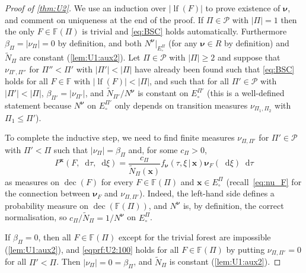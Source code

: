 \documentclass[reqno,draft]{amsart}
\numberwithin{equation}{section}
\theoremstyle{plain}
\theoremstyle{remark}
\newcommand*\diff{\mathop{}\!\mathrm{d}}
\newcommand{\fpart}{\Pi} %
\newcommand{\nurates}{R} %
\DeclareMathOperator{\lf}{lf}
\DeclareMathOperator{\dcb}{dec}
\newcommand{\fnu}{f_{\boldsymbol \nu}}
\newcommand{\nn}{\widetilde{N}} %
\newcommand{\la}{\beta} %
\newcommand{\nut}[1]{|\nu_{#1}|}
\begin{document}
\def\fmerge{\fpart_\text{m}}
\def\fnomerge{\fpart_\text{n}}
\begin{proof}[Proof of \cref{thm:U2}]
    We use an induction over $|\lf(F)|$ to prove existence of $\boldsymbol \nu$, and comment on uniqueness at the end of the proof. If $\fpart \in \mathcal{P}$ with $|\fpart| = 1$ then the only $F\in \mathbb{F}(\fpart)$ is trivial and \cref{eq:BSC} holds automatically. Furthermore $\la_\fpart = \nut{\fpart} = 0$ by definition, and both $N^{\boldsymbol \nu} \vert_{E^\fpart_\circ }$ (for any $\boldsymbol \nu\in \nurates$ by definition) and $\nn_\fpart$ are constant (\cref{lem:U1:aux2}). Let $\fpart \in \mathcal{P}$ with $|\fpart| \ge 2$ and suppose that $\nu_{\fpart',\fpart''}$ for $\fpart'' < \fpart'$ with $|\fpart'| < |\fpart|$ have already been found such that \cref{eq:BSC} holds for all $F\in \mathbb{F}$ with $|\lf(F)| < |\fpart|$, and such that for all $\fpart'\in \mathcal{P}$ with $|\fpart'| < |\fpart|$, $\la_{\fpart'} = \nut{\fpart'}$, and $\nn_{\fpart'} / N^{\boldsymbol \nu}$ is constant on $E^{\fpart'}_\circ $ (this is a well-defined statement because $N^{\boldsymbol \nu}$ on $E^{\fpart'}_\circ $ only depends on transition measures $\nu_{\fpart_1,\fpart_2}$ with $\fpart_1 \le \fpart'$).

    To complete the inductive step, we need to find finite measures $\nu_{\fpart,\fpart'}$ for $\fpart' \in \mathcal{P}$ with $\fpart' < \fpart$ such that $\nut{\fpart} = \la_\fpart$ and, for some $c_\fpart > 0$,
    \begin{equation}\label{eqprf:U2:100}
        P^{\boldsymbol x}(F,\diff \tau,\diff \xi) = \frac{c_\fpart}{\nn_\fpart(\boldsymbol x)} \fnu(\tau,\xi \,\vert\,\boldsymbol x) \boldsymbol \nu_F(\diff \xi) \diff \tau
    \end{equation}
    as measures on $\dcb(F)$ for every $F\in \mathbb{F}(\fpart)$ and $\boldsymbol x\in E^\fpart_\circ $ (recall~\eqref{eq:nu_F} for the connection between $\boldsymbol \nu_F$ and $\nu_{\fpart,\fpart'}$). Indeed, the left-hand side defines a probability measure on $\dcb(\mathbb{F}(\fpart))$, and $N^{\boldsymbol \nu}$ is, by definition, the correct normalisation, so $c_\fpart / \nn_\fpart = 1 / N^{\boldsymbol \nu}$ on $E^\fpart_\circ $.

    If $\la_{\fpart} = 0$, then all $F\in \mathbb{F}(\fpart)$ except for the trivial forest are impossible (\cref{lem:U1:aux2}), and \cref{eqprf:U2:100} holds for all $F\in \mathbb{F}(\fpart)$ by putting $\nu_{\fpart,\fpart'} = 0$ for all $\fpart' < \fpart$. Then $\nut{\fpart} = 0 = \la_\fpart$, and $\nn_\fpart$ is constant (\cref{lem:U1:aux2}). 


\end{proof}
\end{document}
